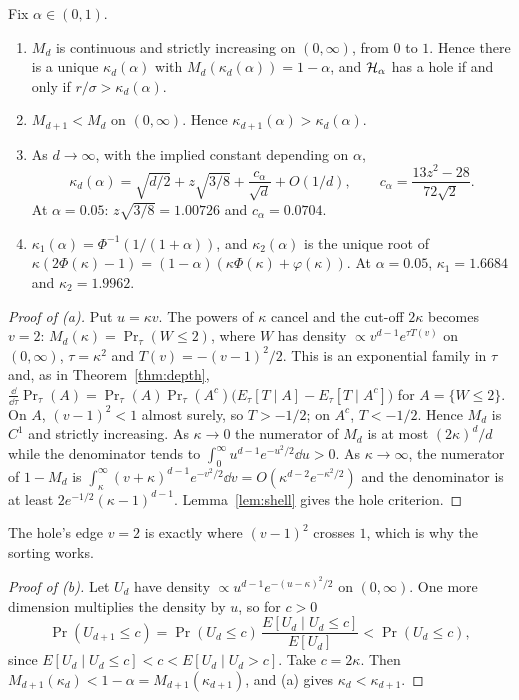 \begin{theorem}\label{thm:main}
Fix $\alpha \in (0,1)$.
\begin{enumerate}[label=(\alph*)]
\item $M_d$ is continuous and strictly increasing on $(0,\infty)$, from $0$ to $1$. Hence there is a unique
$\kappa_d(\alpha)$ with $M_d(\kappa_d(\alpha)) = 1-\alpha$, and $\mathcal{H}_\alpha$ has a hole if and only if $r/\sigma > \kappa_d(\alpha)$.
\item $M_{d+1} < M_d$ on $(0, \infty)$. Hence $\kappa_{d+1}(\alpha) > \kappa_d(\alpha)$.
\item As $d \to \infty$, with the implied constant depending on $\alpha$,
\[ \kappa_d(\alpha) = \sqrt{d/2} + z\sqrt{3/8} + \frac{c_\alpha}{\sqrt d} + O(1/d), \qquad
   c_\alpha = \frac{13z^2 - 28}{72\sqrt2}. \]
At $\alpha = 0.05$: $z\sqrt{3/8} = 1.00726$ and $c_\alpha = 0.0704$.
\item $\kappa_1(\alpha) = \Phi^{-1}(1/(1+\alpha))$, and $\kappa_2(\alpha)$ is the unique root of
$\kappa(2\Phi(\kappa) - 1) = (1-\alpha)(\kappa\Phi(\kappa) + \varphi(\kappa))$. At $\alpha = 0.05$, $\kappa_1 = 1.6684$
and $\kappa_2 = 1.9962$.
\end{enumerate}
\end{theorem}

\begin{proof}[Proof of (a)]
Put $u = \kappa v$. The powers of $\kappa$ cancel and the cut-off $2\kappa$ becomes $v = 2$:
$M_d(\kappa) = \Pr_\tau(W \le 2)$, where $W$ has density $\propto v^{d-1}e^{\tau T(v)}$ on $(0,\infty)$, $\tau = \kappa^2$ and
$T(v) = -(v-1)^2/2$. This is an exponential family in $\tau$ and, as in Theorem~\ref{thm:depth},
$\frac{\dd}{\dd\tau}\Pr_\tau(A) = \Pr_\tau(A)\Pr_\tau(A^c)\bigl(E_\tau[T \mid A] - E_\tau[T \mid A^c]\bigr)$ for
$A = \{W \le 2\}$. On $A$,
$(v-1)^2 < 1$ almost surely, so $T > -1/2$; on $A^c$, $T < -1/2$. Hence $M_d$ is $C^1$ and strictly increasing. As
$\kappa \to 0$ the numerator of $M_d$ is at most $(2\kappa)^d/d$ while the denominator tends to
$\int_0^\infty u^{d-1}e^{-u^2/2}\dd u > 0$. As $\kappa \to \infty$, the numerator of $1 - M_d$ is
$\int_\kappa^\infty (v+\kappa)^{d-1}e^{-v^2/2}\dd v = O(\kappa^{d-2}e^{-\kappa^2/2})$ and the denominator is at least
$2e^{-1/2}(\kappa-1)^{d-1}$. Lemma~\ref{lem:shell} gives the hole criterion.
\end{proof}

The hole's edge $v = 2$ is exactly where $(v-1)^2$ crosses $1$, which is why the sorting works.

\begin{proof}[Proof of (b)]
Let $U_d$ have density $\propto u^{d-1}e^{-(u-\kappa)^2/2}$ on $(0, \infty)$. One more dimension multiplies the density
by $u$, so for $c > 0$
\[ \Pr(U_{d+1} \le c) = \Pr(U_d \le c)\,\frac{E[U_d \mid U_d \le c]}{E[U_d]} < \Pr(U_d \le c), \]
since $E[U_d \mid U_d \le c] < c < E[U_d \mid U_d > c]$. Take $c = 2\kappa$. Then
$M_{d+1}(\kappa_d) < 1 - \alpha = M_{d+1}(\kappa_{d+1})$, and (a) gives $\kappa_d < \kappa_{d+1}$.
\end{proof}

